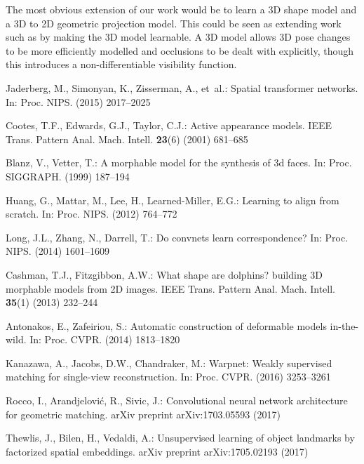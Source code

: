 \documentclass[runningheads]{llncs}
\begin{document}
The most obvious extension of our work would be to learn a 3D shape model and a 3D to 2D geometric projection model. This could be seen as extending work such as \cite{bas20173D,tewari2017mofa} by making the 3D model learnable. A 3D model allows 3D pose changes to be more efficiently modelled and occlusions to be dealt with explicitly, though this introduces a non-differentiable visibility function.


\begin{thebibliography}{10}

Jaderberg, M., Simonyan, K., Zisserman, A.,  et~al.:
\newblock Spatial transformer networks.
\newblock In: Proc. NIPS. (2015)  2017--2025

Cootes, T.F., Edwards, G.J., Taylor, C.J.:
\newblock Active appearance models.
\newblock IEEE Trans. Pattern Anal. Mach. Intell. \textbf{23}(6) (2001)
  681--685

Blanz, V., Vetter, T.:
\newblock A morphable model for the synthesis of 3d faces.
\newblock In: Proc. SIGGRAPH. (1999)  187--194

Huang, G., Mattar, M., Lee, H., Learned-Miller, E.G.:
\newblock Learning to align from scratch.
\newblock In: Proc. NIPS. (2012)  764--772

Long, J.L., Zhang, N., Darrell, T.:
\newblock Do convnets learn correspondence?
\newblock In: Proc. NIPS. (2014)  1601--1609

Cashman, T.J., Fitzgibbon, A.W.:
\newblock What shape are dolphins? building {3D} morphable models from {2D}
  images.
\newblock IEEE Trans. Pattern Anal. Mach. Intell. \textbf{35}(1) (2013)
  232--244

Antonakos, E., Zafeiriou, S.:
\newblock Automatic construction of deformable models in-the-wild.
\newblock In: Proc. CVPR. (2014)  1813--1820

Kanazawa, A., Jacobs, D.W., Chandraker, M.:
\newblock Warpnet: Weakly supervised matching for single-view reconstruction.
\newblock In: Proc. CVPR. (2016)  3253--3261

Rocco, I., Arandjelovi{\'c}, R., Sivic, J.:
\newblock Convolutional neural network architecture for geometric matching.
\newblock arXiv preprint arXiv:1703.05593 (2017)

Thewlis, J., Bilen, H., Vedaldi, A.:
\newblock Unsupervised learning of object landmarks by factorized spatial
  embeddings.
\newblock arXiv preprint arXiv:1705.02193 (2017)


\end{thebibliography}
\end{document}
